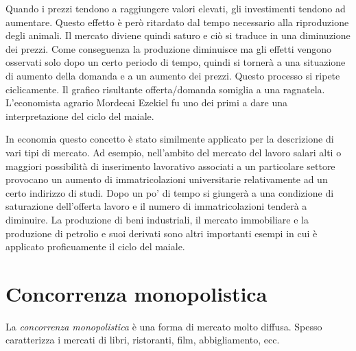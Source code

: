 Quando i prezzi tendono a raggiungere valori elevati, gli 
investimenti tendono ad aumentare. Questo effetto è però 
ritardato dal tempo necessario alla riproduzione degli animali. Il mercato 
diviene quindi saturo e ciò si traduce in una diminuzione dei prezzi. Come 
conseguenza la produzione diminuisce ma gli effetti vengono osservati solo 
dopo un certo periodo di tempo, quindi si tornerà a una situazione di aumento 
della domanda e a un aumento dei prezzi.
Questo processo si ripete ciclicamente. Il grafico risultante 
offerta/domanda somiglia a una ragnatela. L'economista agrario Mordecai 
Ezekiel fu uno dei primi a dare una interpretazione del ciclo del maiale.

In economia questo concetto è stato similmente applicato per la descrizione di 
vari tipi di mercato. Ad esempio, nell'ambito del mercato del lavoro 
salari alti o maggiori possibilità di inserimento lavorativo 
associati a un particolare settore provocano un aumento di immatricolazioni 
universitarie relativamente ad un certo indirizzo di studi. Dopo un po' di 
tempo si giungerà a una condizione di saturazione dell'offerta lavoro e il 
numero di immatricolazioni tenderà a diminuire. La produzione di beni 
industriali, il mercato immobiliare e la produzione di 
petrolio e suoi derivati sono altri importanti esempi in cui è applicato 
proficuamente il ciclo del maiale.

% 
% 
% 




\section{Concorrenza monopolistica}

La \emph{concorrenza monopolistica} è una forma di mercato molto diffusa. 
Spesso caratterizza i mercati di libri, ristoranti, 
film, abbigliamento, ecc.

